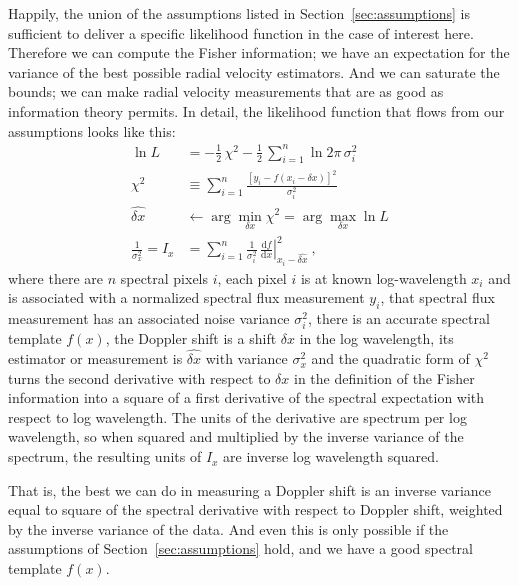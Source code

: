 \documentclass[modern]{aastex631}
\newcommand{\dd}{\mathrm{d}}
\newcommand{\sectionname}{Section}
\newcommand{\secref}[1]{\sectionname~\ref{#1}}
\begin{document}
Happily, the union of the assumptions listed in \secref{sec:assumptions} is sufficient to deliver a specific likelihood function in the case of interest here.
Therefore we can compute the Fisher information; we have an expectation for the variance of the best possible radial velocity estimators.
And we can saturate the bounds; we can make radial velocity measurements that are as good as information theory permits.
In detail, the likelihood function that flows from our assumptions looks like this:
\begin{align}
    \ln L &= -\frac{1}{2}\,\chi^2 - \frac{1}{2}\,\sum_{i=1}^n \ln 2\pi\,\sigma_i^2\label{eq:lnL}\\
    \chi^2 &\equiv \sum_{i=1}^n \frac{[y_i - f(x_i - \delta x)]^2}{\sigma_i^2}\label{eq:chi2}\\
    \widehat{\delta x} &\leftarrow \arg\min_{\delta x} \chi^2 = \arg\max_{\delta x} \ln L\label{eq:argmin}\\
    \frac{1}{\sigma_x^2} = I_x &= \sum_{i=1}^n\frac{1}{\sigma_i^2}\,\left.\frac{\dd f}{\dd x}\right|_{x_i-\widehat{\delta x}}^2\label{eq:ivar}~,
\end{align}
where there are $n$ spectral pixels $i$,
each pixel $i$ is at known log-wavelength $x_i$ and is associated with a normalized spectral flux measurement $y_i$,
that spectral flux measurement has an associated noise variance $\sigma_i^2$,
there is an accurate spectral template $f(x)$,
the Doppler shift is a shift $\delta x$ in the log wavelength,
its estimator or measurement is $\widehat{\delta x}$ with variance $\sigma_x^2$
and
the quadratic form of $\chi^2$ turns the second derivative with respect to $\delta x$ in the definition of the Fisher information into a square of a first derivative of the spectral expectation with respect to log wavelength.
The units of the derivative are spectrum per log wavelength, so when squared and multiplied by the inverse variance of the spectrum, the resulting units of $I_x$ are inverse log wavelength squared.

That is, the best we can do in measuring a Doppler shift is an inverse variance equal to square of the spectral derivative with respect to Doppler shift, weighted by the inverse variance of the data.
And even this is only possible if the assumptions of \secref{sec:assumptions} hold, and we have a good spectral template $f(x)$.
\end{document}
